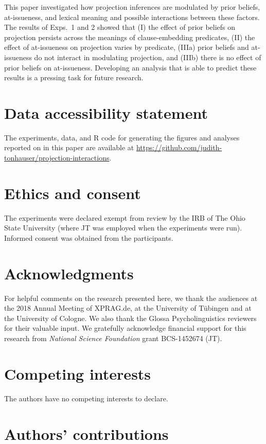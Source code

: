 \documentclass[11pt,fleqn]{article}
\newcommand{\6}{\mbox{$[\hspace*{-.6mm}[$}}
\newcommand{\9}{\mbox{$]\hspace*{-.6mm}]$}}
\begin{document}
This paper investigated how projection inferences are modulated by prior beliefs, at-issueness, and lexical meaning and possible interactions between these factors. The results of Exps.~1 and 2 showed that (I) the effect of prior beliefs on projection persists across the meanings of clause-embedding predicates, (II) the effect of at-issueness on projection varies by predicate, (IIIa) prior beliefs and at-issueness do not interact in modulating projection, and (IIIb) there is no effect of prior beliefs on at-issueness. Developing an analysis that is able to predict these results is a pressing task for future research.


\section*{Data accessibility statement}

The experiments, data, and R code for generating the figures and analyses reported on in this paper are available at \url{https://github.com/judith-tonhauser/projection-interactions}.

\section*{Ethics and consent}

The experiments were declared exempt from review by the IRB of The Ohio State University (where JT was employed when the experiments were run). Informed consent was obtained from the participants.

\section*{Acknowledgments}

For helpful comments on the research presented here, we thank the audiences at the 2018 Annual Meeting of XPRAG.de, at the University of T\"ubingen and at the University of Cologne. We also thank the Glossa Psycholinguistics reviewers for their valuable input. We gratefully acknowledge financial support for this research from {\em National Science Foundation} grant BCS-1452674 (JT).

\section*{Competing interests}

The authors have no competing interests to declare.

\section*{Authors' contributions}
\end{document}
